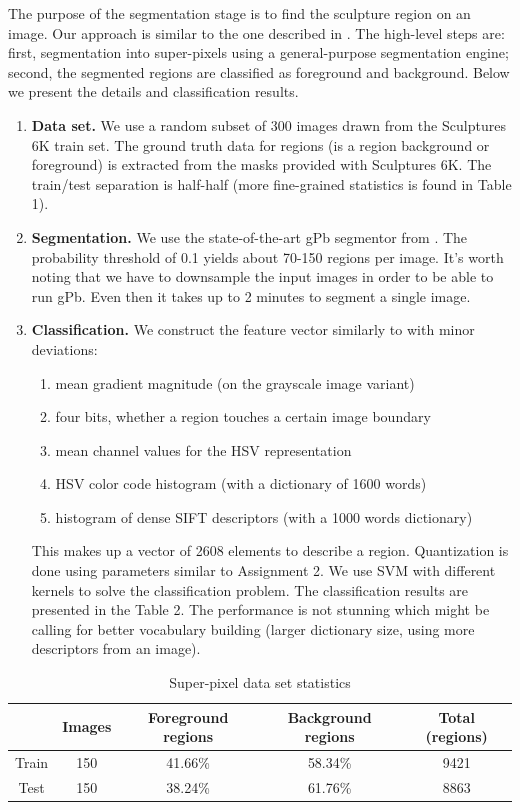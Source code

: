 \documentclass{article}
\begin{document}
The purpose of the segmentation stage is to find the sculpture region
on an image. Our approach is similar to the one described in \cite{Arandjelovic11}.
The high-level steps are: first, segmentation into super-pixels using
a general-purpose segmentation engine; second, the segmented regions
are classified as foreground and background. Below we present the
details and classification results.
\begin{enumerate}
\item \textbf{Data set. }We use a random subset of 300 images drawn from
the Sculptures 6K train set. The ground truth data for regions (is
a region background or foreground) is extracted from the masks provided
with Sculptures 6K. The train/test separation is half-half (more fine-grained
statistics is found in Table 1).
\item \textbf{Segmentation. }We use the state-of-the-art gPb segmentor from
\cite{gpb}. The probability threshold of 0.1 yields about 70-150
regions per image. It's worth noting that we have to downsample the
input images in order to be able to run gPb. Even then it takes up
to 2 minutes to segment a single image.
\item \textbf{Classification. }We construct the feature vector similarly
to \cite{Arandjelovic11} with minor deviations:

\begin{enumerate}
\item mean gradient magnitude (on the grayscale image variant)
\item four bits, whether a region touches a certain image boundary
\item mean channel values for the HSV representation
\item HSV color code histogram (with a dictionary of 1600 words)
\item histogram of dense SIFT descriptors (with a 1000 words dictionary)
\end{enumerate}

This makes up a vector of 2608 elements to describe a region. Quantization
is done using parameters similar to Assignment 2. We use SVM with
different kernels to solve the classification problem. The classification
results are presented in the Table 2. The performance is not stunning
which might be calling for better vocabulary building (larger dictionary
size, using more descriptors from an image).

\end{enumerate}
\begin{table}
\caption{Super-pixel data set statistics}


\centering{}%
\begin{tabular}{|c|c|c|c|c|}
\hline 
 & Images & Foreground regions & Background regions & Total (regions)\tabularnewline
\hline 
\hline 
Train & 150 & 41.66\% & 58.34\% & 9421\tabularnewline
\hline 
Test & 150 & 38.24\% & 61.76\% & 8863\tabularnewline
\hline 
\end{tabular}
\end{table}
\end{document}
